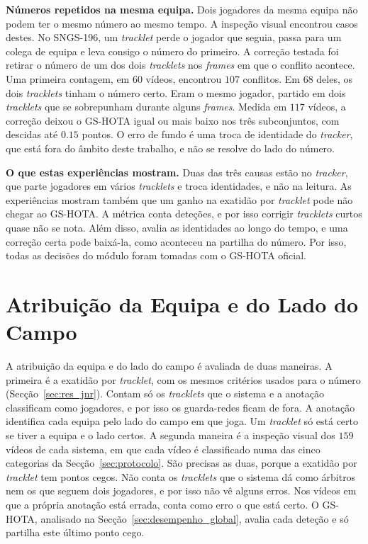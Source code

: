 \medskip\noindent\textbf{Números repetidos na mesma equipa.} Dois jogadores da mesma equipa não podem ter o mesmo número ao mesmo tempo. A inspeção visual encontrou casos destes. No SNGS-196, um \emph{tracklet} perde o jogador que seguia, passa para um colega de equipa e leva consigo o número do primeiro. A correção testada foi retirar o número de um dos dois \emph{tracklets} nos \emph{frames} em que o conflito acontece. Uma primeira contagem, em $60$ vídeos, encontrou $107$ conflitos. Em $68$ deles, os dois \emph{tracklets} tinham o número certo. Eram o mesmo jogador, partido em dois \emph{tracklets} que se sobrepunham durante alguns \emph{frames}. Medida em $117$ vídeos, a correção deixou o GS-HOTA igual ou mais baixo nos três subconjuntos, com descidas até $0.15$ pontos. O erro de fundo é uma troca de identidade do \emph{tracker}, que está fora do âmbito deste trabalho, e não se resolve do lado do número.

\medskip\noindent\textbf{O que estas experiências mostram.} Duas das três causas estão no \emph{tracker}, que parte jogadores em vários \emph{tracklets} e troca identidades, e não na leitura. As experiências mostram também que um ganho na exatidão por \emph{tracklet} pode não chegar ao GS-HOTA. A métrica conta deteções, e por isso corrigir \emph{tracklets} curtos quase não se nota. Além disso, avalia as identidades ao longo do tempo, e uma correção certa pode baixá-la, como aconteceu na partilha do número. Por isso, todas as decisões do módulo foram tomadas com o GS-HOTA oficial.


\section{Atribuição da Equipa e do Lado do Campo}\label{sec:res_equipa}

A atribuição da equipa e do lado do campo é avaliada de duas maneiras. A primeira é a exatidão por \emph{tracklet}, com os mesmos critérios usados para o número (Secção~\ref{sec:res_jnr}). Contam só os \emph{tracklets} que o sistema e a anotação classificam como jogadores, e por isso os guarda-redes ficam de fora. A anotação identifica cada equipa pelo lado do campo em que joga. Um \emph{tracklet} só está certo se tiver a equipa e o lado certos. A segunda maneira é a inspeção visual dos $159$ vídeos de cada sistema, em que cada vídeo é classificado numa das cinco categorias da Secção~\ref{sec:protocolo}. São precisas as duas, porque a exatidão por \emph{tracklet} tem pontos cegos. Não conta os \emph{tracklets} que o sistema dá como árbitros nem os que seguem dois jogadores, e por isso não vê alguns erros. Nos vídeos em que a própria anotação está errada, conta como erro o que está certo. O GS-HOTA, analisado na Secção~\ref{sec:desempenho_global}, avalia cada deteção e só partilha este último ponto cego.

